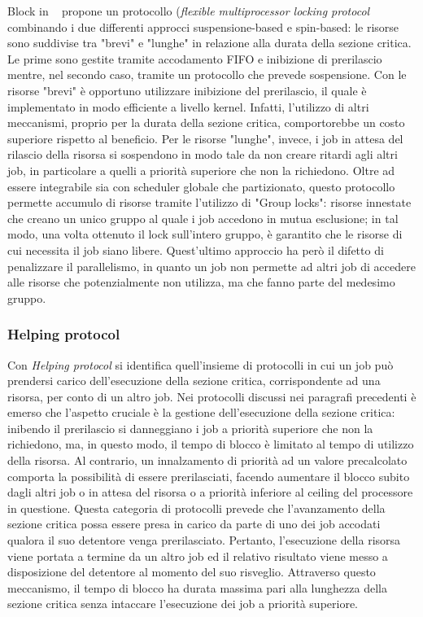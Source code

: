 Block in ~\cite{Block:2007:FRL:1306877.1307316} propone un protocollo (\textit{flexible multiprocessor locking protocol} combinando i due differenti approcci suspensione-based e spin-based: le risorse sono suddivise tra "brevi" e "lunghe" in relazione alla durata della sezione critica. Le prime sono gestite tramite accodamento FIFO e inibizione di prerilascio mentre, nel secondo caso, tramite un protocollo che prevede sospensione. Con le risorse "brevi" è opportuno utilizzare inibizione del prerilascio, il quale è implementato in modo efficiente a livello kernel. Infatti, l'utilizzo di altri meccanismi, proprio per la durata della sezione critica, comportorebbe un costo superiore rispetto al beneficio. Per le risorse "lunghe", invece, i job in attesa del rilascio della risorsa si sospendono in modo tale da non creare ritardi agli altri job, in particolare a quelli a priorità superiore che non la richiedono. Oltre ad essere integrabile sia con scheduler globale che partizionato, questo protocollo permette accumulo di risorse tramite l'utilizzo di "Group locks": risorse innestate che creano un unico gruppo al quale i job accedono in mutua esclusione; in tal modo, una volta ottenuto il lock sull'intero gruppo, è garantito che le risorse di cui necessita il job siano libere. Quest'ultimo approccio ha però il difetto di penalizzare il parallelismo, in quanto un job non permette ad altri job di accedere alle risorse che potenzialmente non utilizza, ma che fanno parte del medesimo gruppo.\\

\subsubsection{Helping protocol}
\label{sec:lockProtocols.help}

Con \textit{Helping protocol} si identifica quell'insieme di protocolli in cui un job può prendersi carico dell'esecuzione della sezione critica, corrispondente ad una risorsa, per conto di un altro job. Nei protocolli discussi nei paragrafi precedenti è emerso che l'aspetto cruciale è la gestione dell'esecuzione della sezione critica: inibendo il prerilascio si danneggiano i job a priorità superiore che non la richiedono, ma, in questo modo, il tempo di blocco è limitato al tempo di utilizzo della risorsa. Al contrario, un innalzamento di priorità ad un valore precalcolato comporta la possibilità di essere prerilasciati, facendo aumentare il blocco subito dagli altri job o in attesa del risorsa o a priorità inferiore al ceiling del processore in questione. Questa categoria di protocolli prevede che l'avanzamento della sezione critica possa essere presa in carico da parte di uno dei job accodati qualora il suo detentore venga prerilasciato. Pertanto, l'esecuzione della risorsa viene portata a termine da un altro job ed il relativo risultato viene messo a disposizione del detentore al momento del suo risveglio. Attraverso questo meccanismo, il tempo di blocco ha durata massima pari alla lunghezza della sezione critica senza intaccare l'esecuzione dei job a priorità superiore.\\

